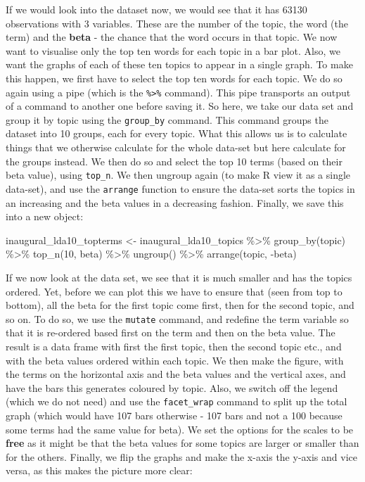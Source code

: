 \documentclass[
]{article}
\newenvironment{Shaded}{\begin{snugshade}}{\end{snugshade}}
\newcommand{\DecValTok}[1]{\textcolor[rgb]{0.00,0.00,0.81}{#1}}
\newcommand{\FunctionTok}[1]{\textcolor[rgb]{0.00,0.00,0.00}{#1}}
\newcommand{\NormalTok}[1]{#1}
\newcommand{\OtherTok}[1]{\textcolor[rgb]{0.56,0.35,0.01}{#1}}
\newcommand{\SpecialCharTok}[1]{\textcolor[rgb]{0.00,0.00,0.00}{#1}}
\begin{document}
If we would look into the dataset now, we would see that it has 63130 observations with 3 variables. These are the number of the topic, the word (the term) and the \textbf{beta} - the chance that the word occurs in that topic. We now want to visualise only the top ten words for each topic in a bar plot. Also, we want the graphs of each of these ten topics to appear in a single graph. To make this happen, we first have to select the top ten words for each topic. We do so again using a pipe (which is the \texttt{\%\textgreater{}\%} command). This pipe transports an output of a command to another one before saving it. So here, we take our data set and group it by topic using the \texttt{group\_by} command. This command groups the dataset into 10 groups, each for every topic. What this allows us is to calculate things that we otherwise calculate for the whole data-set but here calculate for the groups instead. We then do so and select the top 10 terms (based on their beta value), using \texttt{top\_n}. We then ungroup again (to make R view it as a single data-set), and use the \texttt{arrange} function to ensure the data-set sorts the topics in an increasing and the beta values in a decreasing fashion. Finally, we save this into a new object:

\begin{Shaded}
\begin{Highlighting}[]
\NormalTok{inaugural\_lda10\_topterms }\OtherTok{\textless{}{-}}\NormalTok{ inaugural\_lda10\_topics }\SpecialCharTok{\%\textgreater{}\%}
    \FunctionTok{group\_by}\NormalTok{(topic) }\SpecialCharTok{\%\textgreater{}\%}
    \FunctionTok{top\_n}\NormalTok{(}\DecValTok{10}\NormalTok{, beta) }\SpecialCharTok{\%\textgreater{}\%}
    \FunctionTok{ungroup}\NormalTok{() }\SpecialCharTok{\%\textgreater{}\%}
    \FunctionTok{arrange}\NormalTok{(topic, }\SpecialCharTok{{-}}\NormalTok{beta)}
\end{Highlighting}
\end{Shaded}

If we now look at the data set, we see that it is much smaller and has the topics ordered. Yet, before we can plot this we have to ensure that (seen from top to bottom), all the beta for the first topic come first, then for the second topic, and so on. To do so, we use the \texttt{mutate} command, and redefine the term variable so that it is re-ordered based first on the term and then on the beta value. The result is a data frame with first the first topic, then the second topic etc., and with the beta values ordered within each topic. We then make the figure, with the terms on the horizontal axis and the beta values and the vertical axes, and have the bars this generates coloured by topic. Also, we switch off the legend (which we do not need) and use the \texttt{facet\_wrap} command to split up the total graph (which would have 107 bars otherwise - 107 bars and not a 100 because some terms had the same value for beta). We set the options for the scales to be \textbf{free} as it might be that the beta values for some topics are larger or smaller than for the others. Finally, we flip the graphs and make the x-axis the y-axis and vice versa, as this makes the picture more clear:
\end{document}
